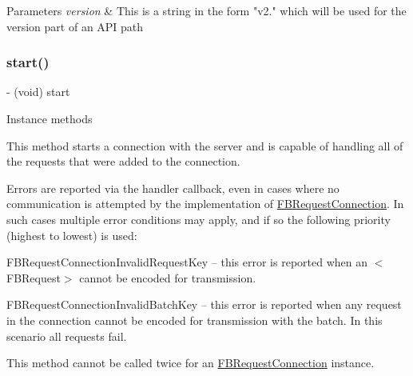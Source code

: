 \begin{DoxyParams}{Parameters}
{\em version} & This is a string in the form "v2." which will be used for the version part of an A\+PI path \\
\hline
\end{DoxyParams}
\mbox{\label{interfaceFBRequestConnection_a8ddb3ae0c9915b148492678fdbc66a6c}} 
\subsubsection{\texorpdfstring{start()}{start()}\hspace{0.1cm}{\footnotesize\ttfamily [1/5]}}
{\footnotesize\ttfamily -\/ (void) start \begin{DoxyParamCaption}{ }\end{DoxyParamCaption}}

Instance methods

This method starts a connection with the server and is capable of handling all of the requests that were added to the connection.

Errors are reported via the handler callback, even in cases where no communication is attempted by the implementation of {\ttfamily \hyperlink{interfaceFBRequestConnection}{F\+B\+Request\+Connection}}. In such cases multiple error conditions may apply, and if so the following priority (highest to lowest) is used\+:


\begin{DoxyItemize}
\item {\ttfamily F\+B\+Request\+Connection\+Invalid\+Request\+Key} -- this error is reported when an $<$\+F\+B\+Request$>$ cannot be encoded for transmission.
\item {\ttfamily F\+B\+Request\+Connection\+Invalid\+Batch\+Key} -- this error is reported when any request in the connection cannot be encoded for transmission with the batch. In this scenario all requests fail.
\end{DoxyItemize}

This method cannot be called twice for an {\ttfamily \hyperlink{interfaceFBRequestConnection}{F\+B\+Request\+Connection}} instance. \mbox{\label{interfaceFBRequestConnection_a8ddb3ae0c9915b148492678fdbc66a6c}} 
